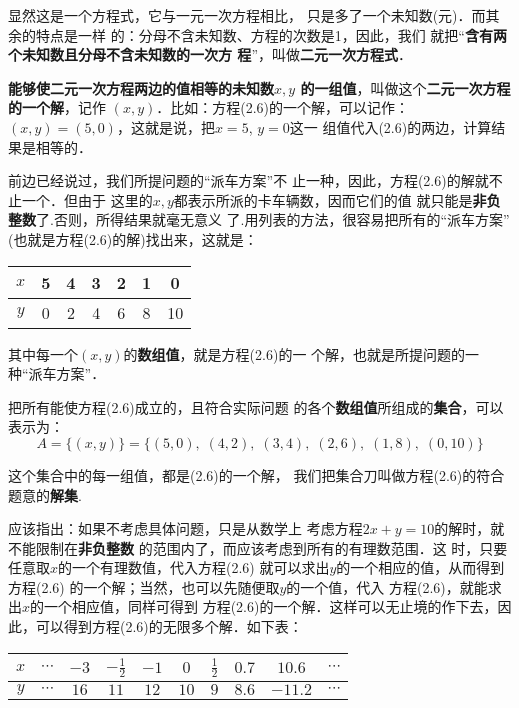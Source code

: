 显然这是一个方程式，它与一元一次方程相比，
只是多了一个未知数(元)．而其余的特点是一样
的：分母不含未知数、方程的次数是1，因此，我们
就把“\textbf{含有两个未知数且分母不含未知数的一次方
程}”，叫做\textbf{二元一次方程式}．

\textbf{能够使二元一次方程两边的值相等的未知数$x,y$
的一组值}，叫做这个\textbf{二元一次方程的一个解}，记作
$(x,y)$．比如：方程(2.6)的一个解，可以记作：
 $ (x,   y)=(5,  0)$，这就是说，把$x=5$, $y=0$这一
组值代入(2.6)的两边，计算结果是相等的．

    前边已经说过，我们所提问题的“派车方案”不
止一种，因此，方程(2.6)的解就不止一个．但由于
这里的$x,  y$都表示所派的卡车辆数，因而它们的值
就只能是\textbf{非负整数}了.否则，所得结果就毫无意义
了.用列表的方法，很容易把所有的“派车方案”
  (也就是方程(2.6)的解)找出来，这就是：
\begin{center}
    \begin{tabular}{c|cccccc}
        \hline
  $x$ &5&4&3&2&1&0\\
  \hline    
  $y$ &0&2&4&6&8&10\\
  \hline
    \end{tabular}
\end{center}
其中每一个$(x,y)$的\textbf{数组值}，就是方程(2.6)的一
个解，也就是所提问题的一种“派车方案”．

    把所有能使方程(2.6)成立的，且符合实际问题
的各个\textbf{数组值}所组成的\textbf{集合}，可以表示为：
\[A=\{(x,y)\}=\{(5,0),\; (4,2),\;(3,4),\;(2,6),\;(1,8),\;(0,10)\}\]

这个集合中的每一组值，都是(2.6)的一个解，
我们把集合刀叫做方程(2.6)的符合题意的\textbf{解集}.

    应该指出：如果不考虑具体问题，只是从数学上
考虑方程$2x + y=10$的解时，就不能限制在\textbf{非负整数}
的范围内了，而应该考虑到所有的有理数范围．这
时，只要任意取$x$的一个有理数值，代入方程(2.6)
就可以求出$y$的一个相应的值，从而得到方程(2.6)
的一个解；当然，也可以先随便取$y$的一个值，代入
方程(2.6)，就能求出$x$的一个相应值，同样可得到
方程(2.6)的一个解．这样可以无止境的作下去，因
此，可以得到方程(2.6)的无限多个解．如下表：
\begin{center}
    \begin{tabular}{c|ccccccccc}
        \hline
  $x$ &$\cdots$& $-3$ & $-\frac{1}{2}$  & $-1$  & $0$  & $\frac{1}{2}$ & $0.7$ &$10.6$  &$\cdots$\\
  \hline    
  $y$ &$\cdots$& $16$ & $11$  & $12$  &  $10$ & $9$ & $8.6$  &$-11.2$ &$\cdots$\\
  \hline
    \end{tabular}
\end{center}

